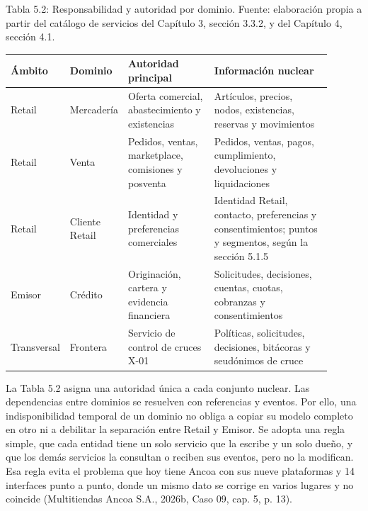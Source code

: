 \documentclass[11pt]{article}
\begin{document}
\par\vspace{0.6\baselineskip}\noindent\begin{minipage}{\linewidth}
Tabla 5.2: Responsabilidad y autoridad por dominio. Fuente: elaboración propia a partir del catálogo de servicios del Capítulo 3, sección 3.3.2, y del Capítulo 4, sección 4.1.\label{tab:t_resp}\par\vspace{0.3\baselineskip}
\begin{tabular}{@{}p{0.104\linewidth}p{0.151\linewidth}p{0.271\linewidth}p{0.375\linewidth}@{}}
\toprule Ámbito & Dominio & Autoridad principal & Información nuclear \\
\midrule
Retail & Mercadería & Oferta comercial, abastecimiento y existencias & Artículos, precios, nodos, existencias, reservas y movimientos \\
Retail & Venta & Pedidos, ventas, marketplace, comisiones y posventa & Pedidos, ventas, pagos, cumplimiento, devoluciones y liquidaciones \\
Retail & Cliente Retail & Identidad y preferencias comerciales & Identidad Retail, contacto, preferencias y consentimientos; puntos y segmentos, según la sección 5.1.5 \\
Emisor & Crédito & Originación, cartera y evidencia financiera & Solicitudes, decisiones, cuentas, cuotas, cobranzas y consentimientos \\
Transversal & Frontera & Servicio de control de cruces X-01 & Políticas, solicitudes, decisiones, bitácoras y seudónimos de cruce \\
\bottomrule
\end{tabular}
\end{minipage}
\par


La Tabla 5.2 asigna una autoridad única a cada conjunto nuclear. Las dependencias entre dominios se resuelven con referencias y eventos. Por ello, una indisponibilidad temporal de un dominio no obliga a copiar su modelo completo en otro ni a debilitar la separación entre Retail y Emisor. Se adopta una regla simple, que cada entidad tiene un solo servicio que la escribe y un solo dueño, y que los demás servicios la consultan o reciben sus eventos, pero no la modifican. Esa regla evita el problema que hoy tiene Ancoa con sus nueve plataformas y 14 interfaces punto a punto, donde un mismo dato se corrige en varios lugares y no coincide (Multitiendas Ancoa S.A., 2026b, Caso 09, cap. 5, p. 13).
\end{document}
